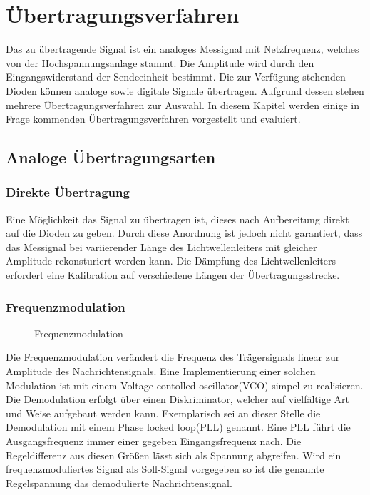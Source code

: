 \section{Übertragungsverfahren}
Das zu übertragende Signal ist ein analoges Messignal mit Netzfrequenz, welches von der Hochspannungsanlage stammt. Die Amplitude wird durch den Eingangswiderstand der Sendeeinheit bestimmt. Die zur Verfügung stehenden Dioden können analoge sowie digitale Signale übertragen. Aufgrund dessen stehen mehrere Übertragungsverfahren zur Auswahl.
In diesem Kapitel werden einige in Frage kommenden Übertragungsverfahren vorgestellt und evaluiert.
\subsection{Analoge Übertragungsarten}
\subsubsection{Direkte Übertragung}
Eine Möglichkeit das Signal zu übertragen ist, dieses nach Aufbereitung direkt auf die Dioden zu geben.
Durch diese Anordnung ist jedoch nicht garantiert, dass das Messignal bei variierender Länge des Lichtwellenleiters mit gleicher Amplitude rekonsturiert werden kann. Die Dämpfung des Lichtwellenleiters erfordert eine Kalibration auf verschiedene Längen der Übertragungs\-strecke.
\subsubsection{Frequenzmodulation}
\begin{figure}[H]
\centering
  \scalebox{0.7}{\begin{large}$$\end{large}}
  \caption{Frequenzmodulation}
  \label{fig:fm}
\end{figure}
Die Frequenzmodulation verändert die Frequenz des Trägersignals linear zur Amplitude des Nachrichtensignals.
Eine Implementierung einer solchen Modulation ist mit einem Voltage contolled oscillator(VCO) simpel zu realisieren. Die Demodulation erfolgt über einen Diskriminator, welcher auf vielfältige Art und Weise aufgebaut werden kann. Exemplarisch sei an dieser Stelle die Demodulation mit einem Phase locked loop(PLL) genannt. Eine PLL führt die Ausgangsfrequenz immer einer gegeben Eingangsfrequenz nach. Die Regeldifferenz aus diesen Größen lässt sich als Spannung abgreifen. Wird ein frequenzmoduliertes Signal als Soll-Signal vorgegeben so ist die genannte Regelspannung das demodulierte Nachrichtensignal.

